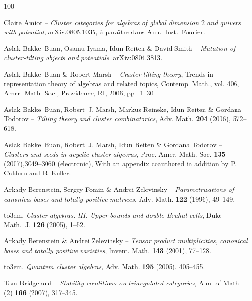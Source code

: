 \documentclass[brochure,12pt]{bourbaki}
\numberwithin{equation}{subsection}
\numberwithin{theorem}{section}
\begin{document}
\def\cprime{$'$} \def\cprime{$'$}
\providecommand{\bysame}{\leavevmode\hbox to3em{\hrulefill}\thinspace}
\begin{thebibliography}{100}

{\sc Claire Amiot} -- \emph{Cluster categories for algebras of global dimension $2$ and
  quivers with potential}, arXiv:0805.1035, \`a para\^{\i}tre dans Ann.~Inst.~Fourier.
  
 

{\sc Aslak Bakke~Buan, Osamu Iyama, Idun Reiten \& David Smith} -- \emph{Mutation of
  cluster-tilting objects and potentials}, arXiv:0804.3813.

{\sc Aslak Bakke~Buan \& Robert Marsh} -- \emph{Cluster-tilting theory}, Trends in
  representation theory of algebras and related topics, Contemp. Math., vol.
  406, Amer. Math. Soc., Providence, RI, 2006, pp.~1--30.

{\sc Aslak Bakke~Buan, Robert~J. Marsh, Markus Reineke, Idun Reiten \& Gordana
  Todorov} -- \emph{Tilting theory and cluster combinatorics}, Adv. Math.
   \textbf{204} (2006), 572--618.

{\sc Aslak Bakke~Buan, Robert~J. Marsh, Idun Reiten \& Gordana Todorov} --
  \emph{Clusters and seeds in acyclic cluster algebras}, Proc. Amer. Math. Soc.
  \textbf{135} (2007),3049--3060 (electronic), With an appendix
  coauthored in addition by P. Caldero and B. Keller.

{\sc Arkady Berenstein, Sergey Fomin \& Andrei Zelevinsky} -- \emph{Parametrizations
  of canonical bases and totally positive matrices}, Adv. Math. \textbf{122}
  (1996), 49--149.

\bysame, \emph{Cluster algebras. {III}. {U}pper bounds and double {B}ruhat
  cells}, Duke Math.~J. \textbf{126} (2005), 1--52.

{\sc Arkady Berenstein \& Andrei Zelevinsky} -- \emph{Tensor product multiplicities,
  canonical bases and totally positive varieties}, Invent. Math. \textbf{143}
  (2001), 77--128.

\bysame, \emph{Quantum cluster algebras}, Adv. Math. \textbf{195} (2005),
  405--455.

{\sc Tom Bridgeland} -- \emph{Stability conditions on triangulated categories}, Ann. of
  Math. (2) \textbf{166} (2007), 317--345.


\end{thebibliography}
\end{document}

